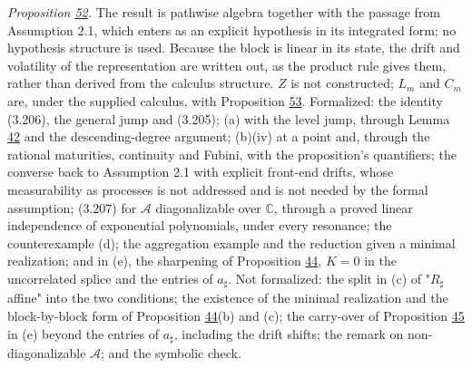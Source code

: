 \documentclass[11pt]{article}
\begin{document}
\emph{Proposition \hyperref[res:Proposition-52]{52}.} The result is pathwise algebra together with the passage from Assumption 2.1, which enters as an explicit hypothesis in its integrated form; no hypothesis structure is used. Because the block is linear in its state, the drift and volatility of the representation are written out, as the product rule gives them, rather than derived from the calculus structure. \(Z\) is not constructed; \(L_m\) and \(C_m\) are, under the supplied calculus, with Proposition \hyperref[res:Proposition-53]{53}. Formalized: the identity (3.206), the general jump and (3.205); (a) with the level jump, through Lemma \hyperref[res:Lemma-42]{42} and the descending-degree argument; (b)(iv) at a point and, through the rational maturities, continuity and Fubini, with the proposition's quantifiers; the converse back to Assumption 2.1 with explicit front-end drifts, whose measurability as processes is not addressed and is not needed by the formal assumption; (3.207) for \(\mathcal A\) diagonalizable over \(\mathbb C\), through a proved linear independence of exponential polynomials, under every resonance; the counterexample (d); the aggregation example and the reduction given a minimal realization; and in (e), the sharpening of Proposition \hyperref[res:Proposition-44]{44}, \(K=0\) in the uncorrelated splice and the entries of \(a_\sharp\). Not formalized: the split in (c) of "\(R_\sharp\) affine" into the two conditions; the existence of the minimal realization and the block-by-block form of Proposition \hyperref[res:Proposition-44]{44}(b) and (c); the carry-over of Proposition \hyperref[res:Proposition-45]{45} in (e) beyond the entries of \(a_\sharp\), including the drift shifts; the remark on non-diagonalizable \(\mathcal A\); and the symbolic check.
\end{document}
